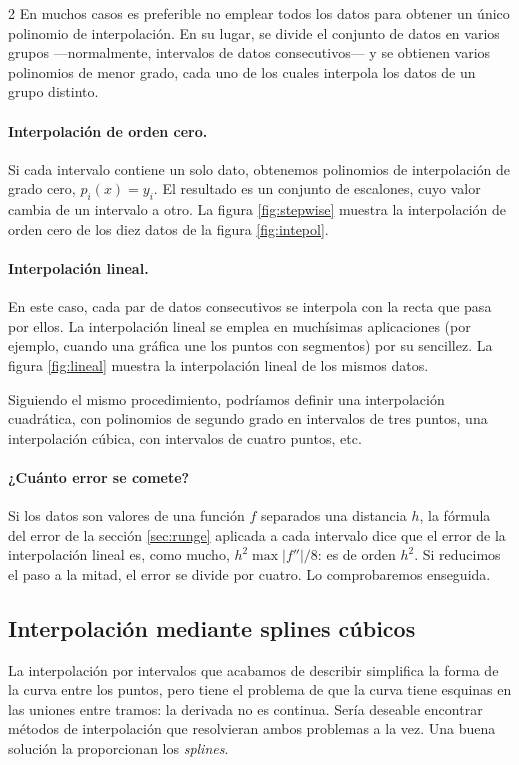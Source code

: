 \begin{paracol}{2}
En muchos casos es preferible no emplear todos los datos para obtener un único polinomio de interpolación. En su lugar, se divide el conjunto de datos en varios grupos ---normalmente, intervalos de datos consecutivos--- y se obtienen varios polinomios de menor grado, cada uno de los cuales interpola los datos de un grupo distinto.

\paragraph{Interpolación de orden cero.}  Si cada intervalo contiene un solo dato, obtenemos polinomios de interpolación de grado cero, $p_i(x)=y_i$. El resultado es un conjunto de escalones, cuyo valor cambia de un intervalo a otro. La figura \ref{fig:stepwise} muestra la interpolación de orden cero de los diez datos de la figura \ref{fig:intepol}.

\paragraph{Interpolación lineal.}  En este caso, cada par de datos consecutivos se interpola con la recta que pasa por ellos. La interpolación lineal se emplea en muchísimas aplicaciones (por ejemplo, cuando una gráfica une los puntos con segmentos) por su sencillez. La figura \ref{fig:lineal} muestra la interpolación lineal de los mismos datos.

Siguiendo el mismo procedimiento, podríamos definir una interpolación cuadrática, con polinomios de segundo grado en intervalos de tres puntos, una interpolación cúbica, con intervalos de cuatro puntos, etc.

\paragraph{¿Cuánto error se comete?} Si los datos son valores de una función $f$ separados una distancia $h$, la fórmula del error de la sección \ref{sec:runge} aplicada a cada intervalo dice que el error de la interpolación lineal es, como mucho, $h^2\max\lvert f''\rvert/8$: es de orden $h^2$. Si reducimos el paso a la mitad, el error se divide por cuatro. Lo comprobaremos enseguida.

\subsection{Interpolación mediante splines cúbicos} 
La interpolación por intervalos que acabamos de describir simplifica la forma de la curva entre los puntos, pero tiene el problema de que la curva tiene esquinas en las uniones entre tramos: la derivada no es continua. Sería deseable encontrar métodos de interpolación que resolvieran ambos problemas a la vez. Una buena solución la proporcionan los \emph{splines}.


\end{paracol}
